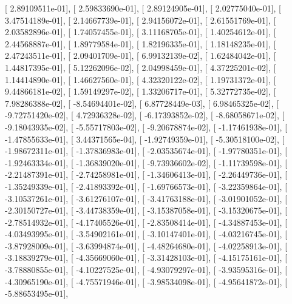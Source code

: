 \documentclass{article}
\begin{document}
       [  2.89109511e-01],
       [  2.59833690e-01],
       [  2.89124905e-01],
       [  2.02775040e-01],
       [  3.47514189e-01],
       [  2.14667739e-01],
       [  2.94156072e-01],
       [  2.61551769e-01],
       [  2.03582896e-01],
       [  1.74057455e-01],
       [  3.11168705e-01],
       [  1.40254612e-01],
       [  2.44568887e-01],
       [  1.89779584e-01],
       [  1.82196335e-01],
       [  1.18148235e-01],
       [  2.47243511e-01],
       [  2.09401709e-01],
       [  6.99132139e-02],
       [  1.62484042e-01],
       [  1.44817395e-01],
       [  5.12262096e-02],
       [  2.04998459e-01],
       [  4.37225201e-02],
       [  1.14414890e-01],
       [  1.46627560e-01],
       [  4.32320122e-02],
       [  1.19731372e-01],
       [  9.44866181e-02],
       [  1.59149297e-02],
       [  1.33206717e-01],
       [  5.32772735e-02],
       [  7.98286388e-02],
       [ -8.54694401e-02],
       [  6.87728449e-03],
       [  6.98465325e-02],
       [ -9.72751420e-02],
       [  4.72936328e-02],
       [ -6.17393852e-02],
       [ -8.68058671e-02],
       [ -9.18043935e-02],
       [ -5.55717803e-02],
       [ -9.20678874e-02],
       [ -1.17461938e-01],
       [ -1.47855633e-01],
       [  3.44371565e-04],
       [ -1.92749359e-01],
       [ -5.30518100e-02],
       [ -1.98672311e-01],
       [ -1.37836983e-01],
       [ -2.03535674e-01],
       [ -1.97780351e-01],
       [ -1.92463334e-01],
       [ -1.36839020e-01],
       [ -9.73936602e-02],
       [ -1.11739598e-01],
       [ -2.21487391e-01],
       [ -2.74258981e-01],
       [ -1.34606413e-01],
       [ -2.26449736e-01],
       [ -1.35249339e-01],
       [ -2.41893392e-01],
       [ -1.69766573e-01],
       [ -3.22359864e-01],
       [ -3.10537261e-01],
       [ -3.61276107e-01],
       [ -3.41763188e-01],
       [ -3.01901052e-01],
       [ -2.30150727e-01],
       [ -3.44738359e-01],
       [ -3.15387058e-01],
       [ -3.15320675e-01],
       [ -2.78514932e-01],
       [ -4.17405526e-01],
       [ -2.83508414e-01],
       [ -4.34887453e-01],
       [ -4.03493995e-01],
       [ -3.54902161e-01],
       [ -3.10147401e-01],
       [ -4.03216745e-01],
       [ -3.87928009e-01],
       [ -3.63994874e-01],
       [ -4.48264680e-01],
       [ -4.02258913e-01],
       [ -3.18839279e-01],
       [ -4.35669060e-01],
       [ -3.31428103e-01],
       [ -4.15175161e-01],
       [ -3.78880855e-01],
       [ -4.10227525e-01],
       [ -4.93079297e-01],
       [ -3.93595316e-01],
       [ -4.30965190e-01],
       [ -4.75571946e-01],
       [ -3.98534098e-01],
       [ -4.95641872e-01],
       [ -5.88653495e-01],
\end{document}
